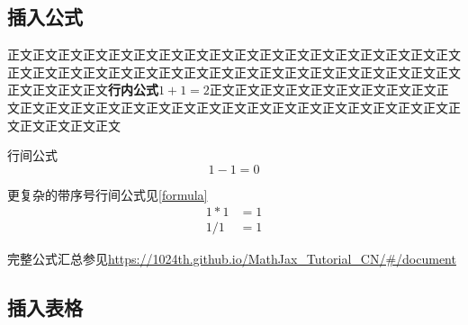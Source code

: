 \documentclass[a4paper]{article}
\begin{document}
\subsection{插入公式}
正文正文正文正文正文正文正文正文正文正文正文正文正文正文正文正文正文正文正文正文正文正文正文正文正文正文正文正文正文正文正文正文正文正文正文正文正文正文正文正文\textbf{行内公式}$1+1=2$正文正文正文正文正文正文正文正文正文正文正文正文正文正文正文正文正文正文正文正文正文正文正文正文正文正文正文正文正文正文正文正文

行间公式
$$
1-1=0
$$

更复杂的带序号行间公式见\ref{formula}
\begin{equation}
\begin{aligned}
1*1&=1\\
1/1&=1
\end{aligned}
\label{formula}
\end{equation}

完整公式汇总参见\url{https://1024th.github.io/MathJax_Tutorial_CN/#/document}

\newpage
\subsection{插入表格}
\end{document}
